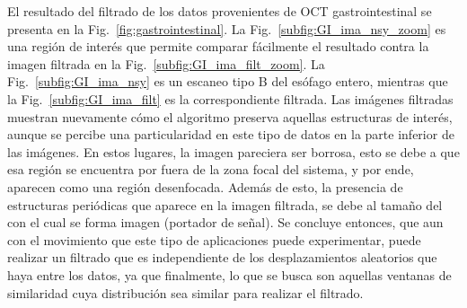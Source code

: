 El resultado del filtrado de los datos provenientes de OCT gastrointestinal se presenta en la Fig.~\ref{fig:gastrointestinal}. La Fig.~\ref{subfig:GI_ima_nsy_zoom} es una región de interés que permite comparar fácilmente el resultado contra la imagen filtrada en la Fig.~\ref{subfig:GI_ima_filt_zoom}. La Fig.~\ref{subfig:GI_ima_nsy} es un escaneo tipo B del esófago entero, mientras que la Fig.~\ref{subfig:GI_ima_filt} es la correspondiente filtrada. Las imágenes filtradas muestran nuevamente cómo el algoritmo preserva aquellas estructuras de interés, aunque se percibe una particularidad en este tipo de datos en la parte inferior de las imágenes. En estos lugares, la imagen pareciera ser borrosa, esto se debe a que esa región se encuentra por fuera de la zona focal del sistema, y por ende, aparecen como una región desenfocada. Además de esto, la presencia de estructuras periódicas que aparece en la imagen filtrada, se debe al tamaño del \speckle con el cual se forma imagen (\speckle portador de señal). Se concluye entonces, que aun con el movimiento que este tipo de aplicaciones puede experimentar, \nlmeansOCT puede realizar un filtrado que es independiente de los desplazamientos aleatorios que haya entre los datos, ya que finalmente, lo que se busca son aquellas ventanas de similaridad cuya distribución sea similar para realizar el filtrado.


